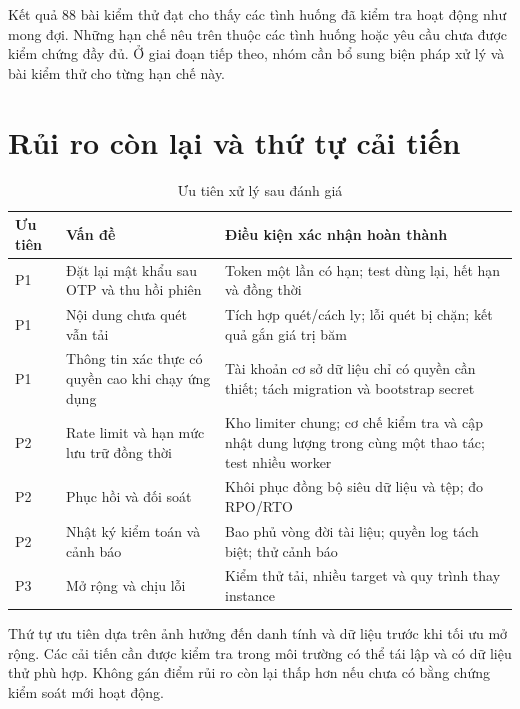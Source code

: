 Kết quả 88 bài kiểm thử đạt cho thấy các tình huống đã kiểm tra hoạt động như mong đợi. Những hạn chế nêu trên thuộc các tình huống hoặc yêu cầu chưa được kiểm chứng đầy đủ. Ở giai đoạn tiếp theo, nhóm cần bổ sung biện pháp xử lý và bài kiểm thử cho từng hạn chế này.

\section{Rủi ro còn lại và thứ tự cải tiến}
\begin{table}[htbp]\centering\small
\caption{Ưu tiên xử lý sau đánh giá}
\begin{tabularx}{\textwidth}{P{1.6cm}P{4.2cm}X}\toprule
\textbf{Ưu tiên}&\textbf{Vấn đề}&\textbf{Điều kiện xác nhận hoàn thành}\\\midrule
P1 & Đặt lại mật khẩu sau OTP và thu hồi phiên & Token một lần có hạn; test dùng lại, hết hạn và đồng thời\\
P1 & Nội dung chưa quét vẫn tải & Tích hợp quét/cách ly; lỗi quét bị chặn; kết quả gắn giá trị băm\\
P1 & Thông tin xác thực có quyền cao khi chạy ứng dụng & Tài khoản cơ sở dữ liệu chỉ có quyền cần thiết; tách migration và bootstrap secret\\
P2 & Rate limit và hạn mức lưu trữ đồng thời & Kho limiter chung; cơ chế kiểm tra và cập nhật dung lượng trong cùng một thao tác; test nhiều worker\\
P2 & Phục hồi và đối soát & Khôi phục đồng bộ siêu dữ liệu và tệp; đo RPO/RTO\\
P2 & Nhật ký kiểm toán và cảnh báo & Bao phủ vòng đời tài liệu; quyền log tách biệt; thử cảnh báo\\
P3 & Mở rộng và chịu lỗi & Kiểm thử tải, nhiều target và quy trình thay instance\\\bottomrule
\end{tabularx}\end{table}
Thứ tự ưu tiên dựa trên ảnh hưởng đến danh tính và dữ liệu trước khi tối ưu mở rộng. Các cải tiến cần được kiểm tra trong môi trường có thể tái lập và có dữ liệu thử phù hợp. Không gán điểm rủi ro còn lại thấp hơn nếu chưa có bằng chứng kiểm soát mới hoạt động.

